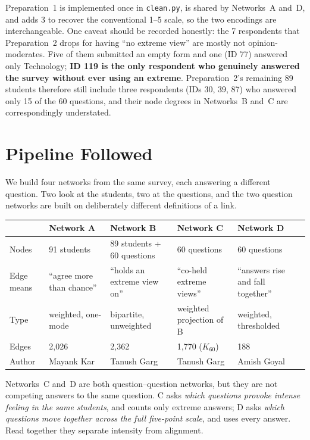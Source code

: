 \documentclass[11pt, a4paper]{article}
\begin{document}
Preparation~1 is implemented once in \texttt{clean.py}, is shared by Networks~A and~D, and adds 3 to recover the
conventional 1--5 scale, so the two encodings are interchangeable. One caveat should be recorded honestly: the 7 respondents that
Preparation~2 drops for having ``no extreme view'' are mostly not opinion-moderates. Five of them submitted an
empty form and one (ID 77) answered only Technology; \textbf{ID 119 is the only respondent who genuinely
answered the survey without ever using an extreme}. Preparation~2's remaining 89 students therefore still
include three respondents (IDs 30, 39, 87) who answered only 15 of the 60 questions, and their node degrees in
Networks~B and~C are correspondingly understated.

\section{Pipeline Followed}

We build four networks from the same survey, each answering a different question. Two look at the students,
two at the questions, and the two question networks are built on deliberately different definitions of a link.

\begin{center}
\footnotesize
\begin{tabular}{p{1.9cm}p{2.9cm}p{3.2cm}p{2.7cm}p{2.9cm}}
\toprule
 & \textbf{Network A} & \textbf{Network B} & \textbf{Network C} & \textbf{Network D} \\
\midrule
Nodes & 91 students & 89 students + 60 questions & 60 questions & 60 questions \\
Edge means & ``agree more than chance'' & ``holds an extreme view on'' & ``co-held extreme views'' & ``answers rise and fall together'' \\
Type & weighted, one-mode & bipartite, unweighted & weighted projection of B & weighted, thresholded \\
Edges & 2{,}026 & 2{,}362 & 1{,}770 ($K_{60}$) & 188 \\
Author & Mayank Kar & Tanush Garg & Tanush Garg & Amish Goyal \\
\bottomrule
\end{tabular}
\end{center}

Networks~C and~D are both question--question networks, but they are not competing answers to the same question.
C asks \emph{which questions provoke intense feeling in the same students}, and counts only extreme answers; D
asks \emph{which questions move together across the full five-point scale}, and uses every answer. Read together
they separate intensity from alignment.
\end{document}
